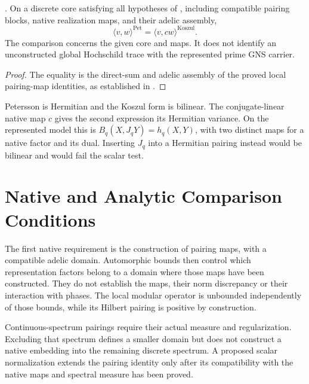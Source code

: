 \begin{theorem}
\label{v4-arith:w5-c:thm:main}
\ClaimStatusProvedHereConditional. On a discrete core satisfying
all hypotheses of ,
including compatible pairing blocks, native realization maps,
and their adelic assembly,
\begin{equation}
 \langle v,w\rangle^{\mathrm{Pet}}
       =\langle v,cw\rangle^{\mathrm{Koszul}}.
 \label{v4-arith:w5-c:eq:main}
\end{equation}
The comparison concerns the given core and maps. It does not
identify an unconstructed global Hochschild trace with the
represented prime GNS carrier.
\end{theorem}
\begin{proof}
The equality is the direct-sum and adelic assembly of the proved
local pairing-map identities, as established in
.
\end{proof}

\begin{remark}
\label{v4-arith:w5-c:rem:source-disjointness-comparison}
Petersson is Hermitian and the Koszul form is bilinear. The
conjugate-linear native map $c$ gives the second expression its
Hermitian variance. On the represented model this is
$B_q(X,J_qY)=h_q(X,Y)$, with two distinct maps for a native
factor and its dual. Inserting $J_q$ into a Hermitian pairing
instead would be bilinear and would fail the scalar test.
\end{remark}

\section{Native and Analytic Comparison Conditions}
\label{v4-arith:w5-c:remaining-conditional}

The first native requirement is the construction of pairing
maps, with a compatible adelic domain. Automorphic bounds then
control which representation factors belong to a domain where
those maps have been constructed. They do not establish the
maps, their norm discrepancy or their interaction with phases.
The local modular operator is unbounded independently of those
bounds, while its Hilbert pairing is positive by construction.

Continuous-spectrum pairings require their actual measure and
regularization. Excluding that spectrum defines a smaller
domain but does not construct a native embedding into the
remaining discrete spectrum. A proposed scalar normalization
extends the pairing identity only after its compatibility with
the native maps and spectral measure has been proved.

